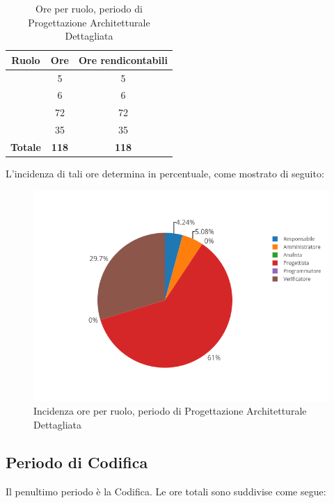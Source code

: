 \begin{table}[H]
	\begin{center}
		\begin{tabular}{|c|c|c|}
			\hline
			\textbf{Ruolo}	& \textbf{Ore}	& \textbf{Ore rendicontabili} \\
			\hline
			\Res	&	5	&	5 \\
			\hline
			\Amm	&	6	&	6	\\
			\hline
			\Prog   &	72   &	72	\\
			\hline
			\Ver	&	35	&	35	\\
			\hline
			\textbf{Totale} & \textbf{118} & \textbf{118} \\
			\hline
		\end{tabular}
	\end{center}
	\caption{Ore per ruolo, periodo di Progettazione Architetturale Dettagliata}
\end{table}

L'incidenza di tali ore determina in percentuale, come mostrato di seguito:
\begin{figure}[H]
	\centering
	\includegraphics[scale=0.6]{img/ProgettazioneDettaglio.png}
	\caption{Incidenza ore per ruolo, periodo di Progettazione Architetturale Dettagliata}
\end{figure}

\subsection{Periodo di Codifica}
Il penultimo periodo è la Codifica. Le ore totali sono suddivise come segue:

